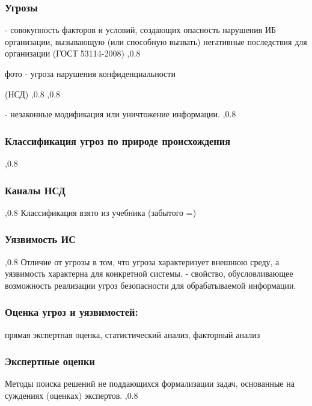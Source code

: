 \documentclass[a4paper,12pt]{report}
\begin{document}
		\subsubsection{Угрозы}

			 - совокупность факторов и условий, создающих опасность нарушения ИБ организации, вызывающую (или способную вызвать) негативные последствия для организации (ГОСТ 53114-2008)
			,0.8

			фото - угроза нарушения конфиденциальности

			 (НСД)
			,0.8
			,0.8

			 - незаконные модификация или уничтожение информации.
			,0.8

		\subsubsection{Классификация угроз по природе происхождения}
			,0.8

		\subsubsection{Каналы НСД}
			,0.8
			Классификация взято из учебника (забытого =)

		\subsubsection{Уязвимость ИС}
			,0.8
			Отличие от угрозы в том, что угроза характеризует внешнюю среду, а уязвимость характерна для конкретной системы.
			 - свойство, обусловливающее возможность реализации угроз безопасности для обрабатываемой информации.

		\subsubsection{Оценка угроз и уязвимостей:} прямая экспертная оценка, статистический анализ, факторный анализ

		\subsubsection{Экспертные оценки}
		Методы поиска решений не поддающихся формализации задач, основанные на суждениях (оценках) экспертов.
		,0.8
\end{document}

